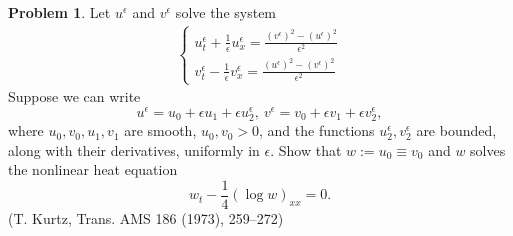 \documentclass[a4paper]{book}
\numberwithin{equation}{chapter}
\theoremstyle{definition}
\newtheorem{pro}[exm]{Problem}
\begin{document}
\begin{pro}
  Let $u^\epsilon$ and $v^\epsilon$ solve the system
  \begin{align*}
    \begin{cases}
      u_t^\epsilon + \frac{1}{\epsilon} u_x^\epsilon = \frac{(v^\epsilon)^2 - (u^\epsilon)^2}{\epsilon^2} \\
      v_t^\epsilon - \frac{1}{\epsilon} v_x^\epsilon = \frac{(u^\epsilon)^2 - (v^\epsilon)^2}{\epsilon^2}
    \end{cases}
  \end{align*}
  Suppose we can write
  \[u^\epsilon = u_0 + \epsilon u_1 + \epsilon u_2^\epsilon,\
    v^\epsilon = v_0 + \epsilon v_1 + \epsilon v_2^\epsilon,\]
  where $u_0,v_0,u_1,v_1$ are smooth, $u_0,v_0 > 0$, and the functions $u_2^\epsilon, v_2^\epsilon$ are bounded, along with their derivatives, uniformly in $\epsilon$. Show that $w := u_0 \equiv v_0 $ and $w$ solves the nonlinear heat equation
  \[w_t - \frac{1}{4} (\log w)_{xx} = 0.\]
  (T. Kurtz, Trans. AMS 186 (1973), 259--272)
\end{pro}
\end{document}
